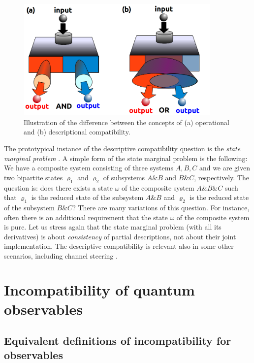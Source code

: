 \documentclass[12pt]{iopart}
\theoremstyle{definition}
\begin{document}
\begin{figure}\begin{center}
\includegraphics[width=10cm]{fig_descriptional.png}
\caption{Illustration of the difference between the concepts of
(a) operational and (b) descriptional compatibility.}
\label{fig:descriptional}
\end{center}
\end{figure}

The prototypical instance of the descriptive compatibility question is the \emph{state marginal problem} \cite{Klyachko04}. 
A simple form of the state marginal problem is the following: We have a composite system consisting of three systems $A,B,C$ and we are given two bipartite states $\varrho_1$ and $\varrho_2$ of subsystems $A\&B$ and $B \& C$, respectively. The question is: does there exists a state $\omega$ of the composite system $A\& B \& C$ such that $\varrho_1$ is the reduced state of the subsystem $A\&B$ and $\varrho_2$ is the reduced state of the subsystem $B \& C$? There are many variations of this question. 
For instance, often there is an additional requirement that the state $\omega$ of the composite system is pure. 
Let us stress again that the state marginal problem (with all its derivatives) is about \emph{consistency} of partial descriptions, not about their joint implementation.
The descriptive compatibility is relevant also in some other scenarios, including channel steering \cite{Piani15}.

\section{Incompatibility of quantum observables}\label{sec:observables}

\subsection{Equivalent definitions of incompatibility for observables}\label{sec:functional}
\end{document}

